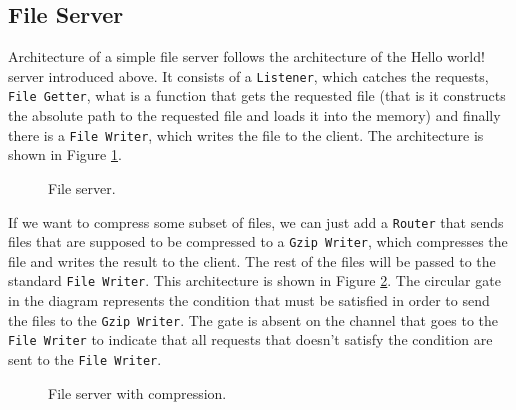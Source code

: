 \subsection{File Server}
\label{sec:fileServer}
Architecture of a simple file server follows the architecture of the Hello world!
server introduced above. It consists of a \texttt{Listener}, which catches the requests,
\texttt{File Getter}, what is a function that gets the requested file (that is it
constructs the absolute path to the requested file and loads it into the memory) 
and finally there is a \texttt{File Writer}, which
writes the file to the client. The architecture is shown in Figure \ref{fig:fileServer}.
\begin{figure}[h]
\centering
{}
\caption[scale=1.0]{File server.}
\label{fig:fileServer}
\end{figure}

If we want to compress some subset of files, we can just add a \texttt{Router}
that sends files that are supposed to be compressed to a \texttt{Gzip Writer}, which
compresses the file and writes the result to the client. The rest of the files
will be passed to the standard \texttt{File Writer}. This architecture is shown in
Figure \ref{fig:fileServer2}. The circular gate in the diagram represents 
the condition that must be satisfied in order to send the files
to the \texttt{Gzip Writer}. The gate is absent on the channel that goes to
the \texttt{File Writer} to indicate that all requests that doesn't
satisfy the condition are sent to the \texttt{File Writer}.

\begin{figure}[h]
\centering
{}
\caption[scale=1.0]{File server with compression.}
\label{fig:fileServer2}
\end{figure}

